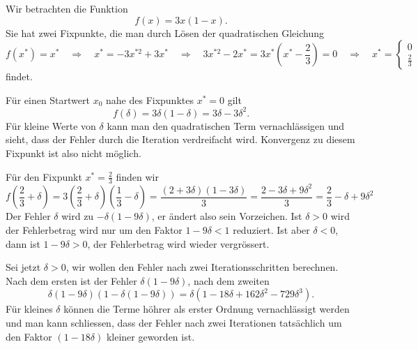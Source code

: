 \begin{beispiel}
\label{buch:beispiel:logistisch3}
Wir betrachten die Funktion
\[
f(x) = 3x(1-x).
\]
Sie hat zwei Fixpunkte, die man durch Lösen der quadratischen
Gleichung
\[
f(x^*)=x^*
\quad\Rightarrow\quad
x^*=-3x^{*2}+3x^*
\quad\Rightarrow\quad
3x^{*2}-2x^*=3x^*(x^*-{\textstyle\frac23})=0
\quad\Rightarrow\quad
x^*=
\begin{cases}
0      &\\
\frac23&
\end{cases}
\]
findet.

Für einen Startwert $x_0$ nahe des Fixpunktes $x^*=0$ gilt
\[
f(\delta)
=
3\delta(1-\delta)
=
3\delta - 3\delta^2.
\]
Für kleine Werte von $\delta$ kann man den quadratischen Term vernachlässigen
und sieht, dass der Fehler durch die Iteration verdreifacht wird.
Konvergenz zu diesem Fixpunkt ist also nicht möglich.

Für den Fixpunkt $x^* = \frac23$ finden wir
\begin{equation}
f({\textstyle\frac23}+\delta)
=
3({\textstyle\frac23}+\delta)({\textstyle\frac13}-\delta)
=
\frac{(2+3\delta)(1-3\delta)}3
=
\frac{2-3\delta+9\delta^2}{3}
=
\frac23 - \delta  + 9\delta^2
\label{buch:equation:logistic3error}
\end{equation}
Der Fehler $\delta$ wird zu $ -\delta(1-9\delta) $, er ändert also sein
Vorzeichen.
Ist $\delta>0$ wird der Fehlerbetrag wird nur um den Faktor $1-9\delta < 1$
reduziert.
Ist aber $\delta <0$, dann ist $1-9\delta>0$, der Fehlerbetrag wird wieder
vergrössert.

Sei jetzt $\delta>0$, wir wollen den Fehler nach zwei Iterationsschritten
berechnen.
Nach dem ersten ist der Fehler $\delta(1-9\delta)$, nach dem zweiten
\[
\delta(1-9\delta)(1-\delta(1-9\delta))
=
\delta(1-18\delta + 162\delta^2-729\delta^3).
\]
Für kleines $\delta$ können die Terme höhrer als erster Ordnung
vernachlässigt werden und man kann schliessen, dass der Fehler nach
zwei Iterationen tatsächlich um den Faktor $(1-18\delta)$ kleiner
geworden ist.


\end{beispiel}
